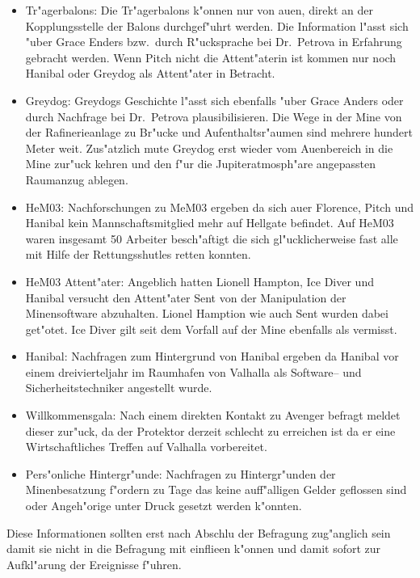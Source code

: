 \begin{itemize}
	\item Tr"agerbalons: Die Tr"agerbalons k"onnen nur von au\3en, direkt an der Kopplungsstelle der Balons durchgef"uhrt werden. Die Information l"asst sich "uber Grace Enders bzw.~durch R"ucksprache bei Dr.~Petrova in Erfahrung gebracht werden. Wenn Pitch nicht die Attent"aterin ist kommen nur noch Hanibal oder Greydog als Attent"ater in Betracht.
	\item Greydog: Greydogs Geschichte l"asst sich ebenfalls "uber Grace Anders oder durch Nachfrage bei Dr.~Petrova plausibilisieren. Die Wege in der Mine von der Rafinerieanlage zu Br"ucke und Aufenthaltsr"aumen sind mehrere hundert Meter weit. Zus"atzlich mu\3te Greydog erst wieder vom Au\3enbereich in die Mine zur"uck kehren und den f"ur die Jupiteratmosph"are angepassten Raumanzug ablegen.
	\item HeM03: Nachforschungen zu MeM03 ergeben da\3 sich au\3er Florence, Pitch und Hanibal kein Mannschaftsmitglied mehr auf Hellgate befindet. Auf HeM03 waren insgesamt 50 Arbeiter besch"aftigt die sich gl"ucklicherweise fast alle mit Hilfe der Rettungsshutles retten konnten. 
	\item HeM03 Attent"ater: Angeblich hatten Lionell Hampton, Ice Diver und Hanibal versucht den Attent"ater Sent von der Manipulation der Minensoftware abzuhalten. Lionel Hamption wie auch Sent wurden dabei get"otet. Ice Diver gilt seit dem Vorfall auf der Mine ebenfalls als vermisst.
	\item Hanibal: Nachfragen zum Hintergrund von Hanibal ergeben da\3 Hanibal vor einem dreivierteljahr im Raumhafen von Valhalla als Software-- und Sicherheitstechniker angestellt wurde.
	\item Willkommensgala: Nach einem direkten Kontakt zu Avenger befragt meldet dieser zur"uck, da\3 der Protektor derzeit schlecht zu erreichen ist da er eine Wirtschaftliches Treffen auf Valhalla vorbereitet.
	\item Pers"onliche Hintergr"unde: Nachfragen zu Hintergr"unden der Minenbesatzung f"ordern zu Tage das keine auff"alligen Gelder geflossen sind oder Angeh"orige unter Druck gesetzt werden k"onnten.
\end{itemize}

Diese Informationen sollten erst nach Abschlu\3 der Befragung zug"anglich sein damit sie nicht in die Befragung mit einflie\3en k"onnen und damit sofort zur Aufkl"arung der Ereignisse f"uhren.

